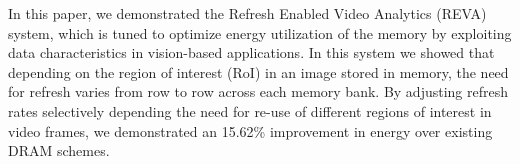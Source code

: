 In this paper, we demonstrated the Refresh Enabled Video Analytics (REVA) system, which is tuned to optimize energy utilization of the memory by exploiting data characteristics in vision-based applications. In this system we showed that depending on the region of interest (RoI) in an image stored in memory, the need for refresh varies from row to row across each memory bank. By adjusting refresh rates selectively depending the need for re-use of different regions of interest in video frames, we demonstrated an 15.62\% improvement in energy over existing DRAM schemes.
